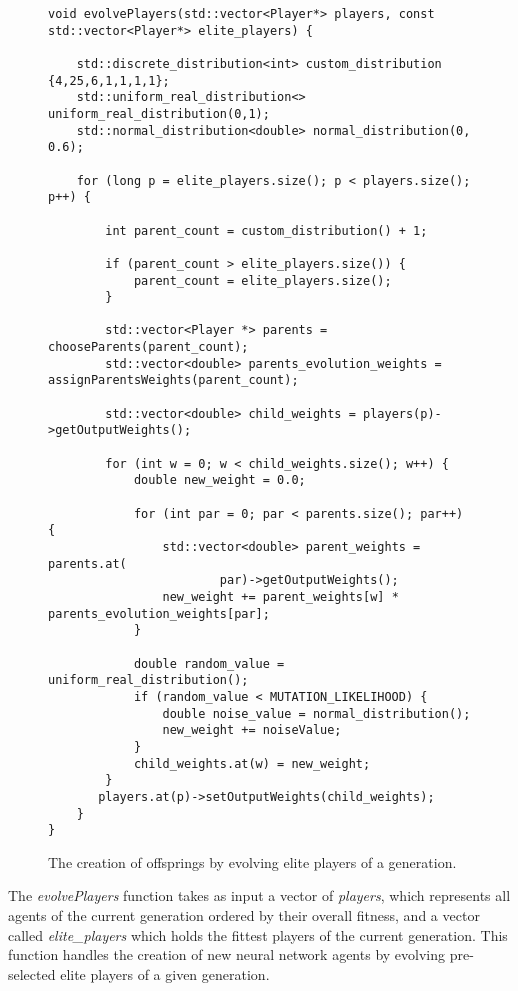 \begin{figure}
\begin{lstlisting}
void evolvePlayers(std::vector<Player*> players, const std::vector<Player*> elite_players) {
   
    std::discrete_distribution<int> custom_distribution {4,25,6,1,1,1,1};
    std::uniform_real_distribution<> uniform_real_distribution(0,1);
    std::normal_distribution<double> normal_distribution(0, 0.6);

    for (long p = elite_players.size(); p < players.size(); p++) {

        int parent_count = custom_distribution() + 1;

        if (parent_count > elite_players.size()) {
            parent_count = elite_players.size();
        }

        std::vector<Player *> parents = chooseParents(parent_count);
        std::vector<double> parents_evolution_weights = assignParentsWeights(parent_count);
        
        std::vector<double> child_weights = players(p)->getOutputWeights();

        for (int w = 0; w < child_weights.size(); w++) {
            double new_weight = 0.0;

            for (int par = 0; par < parents.size(); par++) {
                std::vector<double> parent_weights = parents.at(
                        par)->getOutputWeights();
                new_weight += parent_weights[w] * parents_evolution_weights[par];
            }

            double random_value = uniform_real_distribution();
            if (random_value < MUTATION_LIKELIHOOD) {
                double noise_value = normal_distribution();
                new_weight += noiseValue;
            }
            child_weights.at(w) = new_weight;
        }
       players.at(p)->setOutputWeights(child_weights);
    }
}
\end{lstlisting}
\caption{The creation of offsprings by evolving elite players of a generation.}
\label{fig:evoplayers}
\end{figure}
The \textit{evolvePlayers} function takes as input a vector of \textit{players}, which represents all agents of the current generation ordered by their overall fitness, and a vector called \textit{elite\_players} which holds the fittest players of the current generation. This function handles the creation of new neural network agents by evolving pre-selected elite players of a given generation.\par
